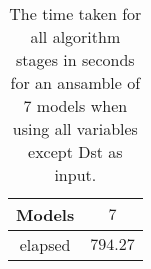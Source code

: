 \begin{table}[!ht]
	\centering
	\begin{tabular}{|c|c|}
		\hline
		Models & $7$ \\ \hline
		elapsed & $794.27$ \\ \hline
	\end{tabular}
	\caption{The time taken for all algorithm stages in seconds for an ansamble of 7 models when using all variables except Dst as input.}
	\label{tab:time:ansamble:reverse:noDst:7}
\end{table}
